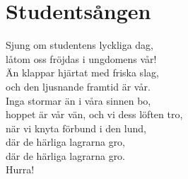 \section{Studentsången}
Sjung om studentens lyckliga dag,\\
låtom oss fröjdas i ungdomens vår!\\
Än klappar hjärtat med friska slag,\\
och den ljusnande framtid är vår.\\
Inga stormar än i våra sinnen bo,\\
hoppet är vår vän, och vi dess löften tro,\\
när vi knyta förbund i den lund,\\
där de härliga lagrarna gro,\\
där de härliga lagrarna gro.\\
Hurra!\\